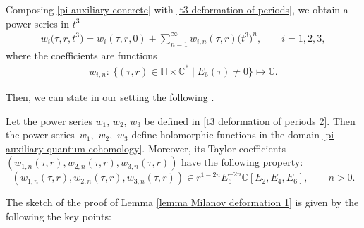 Composing \eqref{pi auxiliary concrete} with \eqref{t3 deformation of periods}, we obtain a power series in \(t^3\)
\begin{gather}\label{t3 deformation of periods 2}
w_{i}\bigl(\tau,r,t^3\bigr) = w_i(\tau,r,0) + \sum_{n=1}^{\infty} w_{i,n}(\tau,r) \bigl( t^3 \bigr)^n, \qquad i=1,2,3,
\end{gather}
where the coefficients are functions
\begin{gather*}
w_{i,n}\colon\ \{(\tau,r) \in \mathbb{H} \times \mathbb{C}^{*} \mid E_6(\tau) \neq 0\} \mapsto \mathbb{C}.
\end{gather*}

Then, we can state in our setting the following \cite[Proposition 5.8]{Milanov}.

\begin{Lemma}\label{lemma Milanov deformation 1}
Let the power series $w_1$, $w_2$, $w_3$ be defined in \eqref{t3 deformation of periods 2}. Then the power series~$w_1$,~$w_2$,~$w_3$ define holomorphic functions in the domain \eqref{pi auxiliary quantum cohomology}.
 Moreover, its Taylor coefficients $(w_{1,n}(\tau,r),w_{2,n}(\tau,r),w_{3,n}(\tau,r))$ have the following property:
\[%
(w_{1,n}(\tau,r),w_{2,n}(\tau,r),w_{3,n}(\tau,r)) \in r^{1-2n}E_6^{-2n}\mathbb{C}[ E_2,E_4,E_6], \qquad n>0 .
\]
\end{Lemma}
The sketch of the proof of Lemma \ref{lemma Milanov deformation 1} is given by the following the key points:

